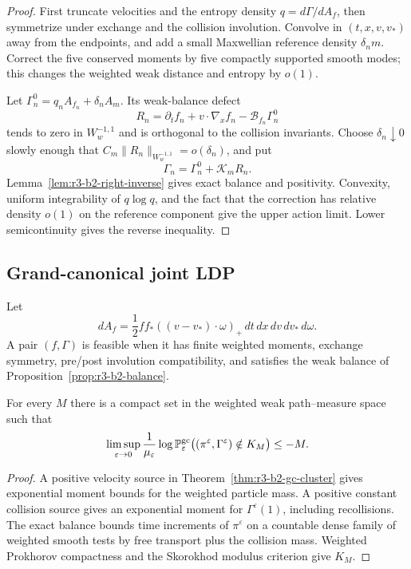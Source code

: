 \begin{proof}
First truncate velocities and the entropy density
\(q=d\Gamma/dA_f\), then symmetrize under exchange and the collision
involution.  Convolve in \((t,x,v,v_*)\) away from the endpoints, and add a
small Maxwellian reference density \(\delta_nm\).  Correct the five conserved
moments by five compactly supported smooth modes; this changes the weighted
weak distance and entropy by \(o(1)\).

Let \(\Gamma_n^0=q_nA_{f_n}+\delta_nA_m\).  Its weak-balance defect
\[
 R_n=\partial_tf_n+v\cdot\nabla_xf_n-\mathscr B_{f_n}\Gamma_n^0
\]
tends to zero in \(W^{-1,1}_w\) and is orthogonal to the collision invariants.
Choose \(\delta_n\downarrow0\) slowly enough that
\(C_m\|R_n\|_{W^{-1,1}_w}=o(\delta_n)\), and put
\[
 \Gamma_n=\Gamma_n^0+\mathscr K_mR_n.
\]
Lemma~\ref{lem:r3-b2-right-inverse} gives exact balance and positivity.
Convexity, uniform integrability of \(q\log q\), and the fact that the
correction has relative density \(o(1)\) on the reference component give the
upper action limit.  Lower semicontinuity gives the reverse inequality.
\end{proof}

\subsection{Grand-canonical joint LDP}

Let
\[
 dA_f=\frac12ff_*((v-v_*)\cdot\omega)_+
 \,dt\,dx\,dv\,dv_*\,d\omega.
\]
A pair \((f,\Gamma)\) is feasible when it has finite weighted moments,
exchange symmetry, pre/post involution compatibility, and satisfies the weak
balance of Proposition~\ref{prop:r3-b2-balance}.

\begin{lemma}
\label{lem:r3-b2-tight}
For every \(M\) there is a compact set in the weighted weak path--measure
space such that
\[
 \limsup_{\varepsilon\to0}\frac1{\mu_\varepsilon}
 \log\mathbb P_\varepsilon^{\rm gc}
 \big((\pi^\varepsilon,\Gamma^\varepsilon)\notin K_M\big)
 \le-M.
\]
\end{lemma}

\begin{proof}
A positive velocity source in
Theorem~\ref{thm:r3-b2-gc-cluster} gives exponential moment bounds for the
weighted particle mass.  A positive constant collision source gives an
exponential moment for \(\Gamma^\varepsilon(1)\), including recollisions.
The exact balance bounds time increments of \(\pi^\varepsilon\) on a countable
dense family of weighted smooth tests by free transport plus the collision
mass.  Weighted Prokhorov compactness and the Skorokhod modulus criterion give
\(K_M\).
\end{proof}

